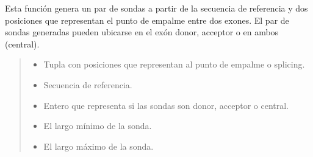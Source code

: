\documentclass[letterpaper,10pt,spanish]{sphinxmanual}
\begin{document}
\begin{fulllineitems}
\label{\detokenize{diseno:diseno.get_probes_from_pos}}
\pysigstartsignatures
{}
\pysigstopsignatures
\sphinxAtStartPar
Esta función genera un par de sondas a partir de la secuencia de referencia y dos posiciones que representan el punto de empalme entre dos exones.
El par de sondas generadas pueden ubicarse en el exón donor, acceptor o en ambos (central).
\begin{quote}\begin{description}
\begin{itemize}
\item {} 
\sphinxAtStartPar
{} \textendash{} Tupla con posiciones que representan al punto de empalme o splicing.

\item {} 
\sphinxAtStartPar
{} \textendash{} Secuencia de referencia.

\item {} 
\sphinxAtStartPar
{} \textendash{} Entero que representa si las sondas son donor, acceptor o central.

\item {} 
\sphinxAtStartPar
{} \textendash{} El largo mínimo de la sonda.

\item {} 
\sphinxAtStartPar
{} \textendash{} El largo máximo de la sonda.


\end{itemize}
\end{description}
\end{quote}
\end{fulllineitems}
\end{document}
